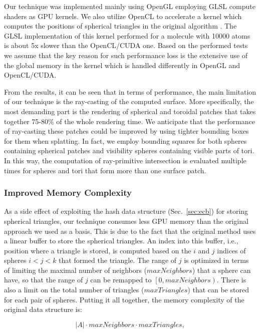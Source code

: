 Our technique was implemented mainly using OpenGL employing GLSL compute shaders as GPU kernels.
We also utilize OpenCL to accelerate a kernel which computes the positions of spherical triangles in the original algorithm \cite{krone2011parallel}.
The GLSL implementation of this kernel performed for a molecule with {\tweakedsim}10000 atoms is about 5x slower than the OpenCL/CUDA one.
Based on the performed tests we assume that the key reason for such performance loss is the extensive use of the global memory in the kernel which is handled differently in OpenGL and OpenCL/CUDA.

From the results, it can be seen that in terms of performance, the main limitation of our technique is the ray-casting of the computed surface.
More specifically, the most demanding part is the rendering of spherical and toroidal patches that takes together 75-80\% of the whole rendering time.
We anticipate that the performance of ray-casting these patches could be improved by using tighter bounding boxes for them when splatting.
In fact, we employ bounding squares for both spheres containing spherical patches and visibility spheres containing visible parts of tori.
In this way, the computation of ray-primitive intersection is evaluated multiple times for spheres and tori that form more than one surface patch.

\subsubsection{Improved Memory Complexity}

As a side effect of exploiting the hash data structure (Sec.~\ref{sec:ecb}) for storing spherical triangles, our technique consumes less GPU memory than the original approach we used as a basis.
This is due to the fact that the original method uses a linear buffer to store the spherical triangles.
An index into this buffer, i.e., position where a triangle is stored, is computed based on the $i$ and $j$ indices of spheres $i < j < k$ that formed the triangle.
The range of $j$ is optimized in terms of limiting the maximal number of neighbors ($maxNeighbors$) that a sphere can have, so that the range of $j$ can be remapped to $\left[0, maxNeighbors\right)$.
There is also a limit on the total number of triangles ($maxTriangles$) that can be stored for each pair of spheres.
Putting it all together, the memory complexity of the original data structure is:

\begin{equation}
|A| \cdot maxNeighbors \cdot maxTriangles,
\end{equation}

